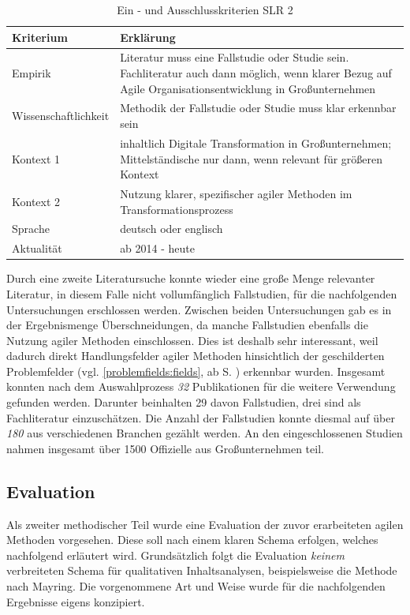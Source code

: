 \begin{table}[ht]
	\centering
	\caption{Ein - und Ausschlusskriterien SLR 2}
	\begin{tabular}{|p{4cm}|p{8cm}|}
		\hline
		\textbf{Kriterium}& \textbf{Erklärung}  \\
		\hline
		Empirik & Literatur muss eine Fallstudie oder Studie sein. Fachliteratur auch dann möglich, wenn klarer Bezug auf Agile Organisationsentwicklung in Großunternehmen \\
		Wissenschaftlichkeit & Methodik der  Fallstudie oder Studie muss klar erkennbar sein \\
		Kontext 1 & inhaltlich Digitale Transformation in Großunternehmen; Mittelständische nur dann, wenn relevant für größeren Kontext \\
		Kontext 2 & Nutzung klarer, spezifischer agiler Methoden im Transformationsprozess \\
		Sprache & deutsch oder englisch \\
		Aktualität & ab 2014 - heute  \\
		\hline
	\end{tabular}
	\label{tab:criteriaslr2}
\end{table}

Durch eine zweite Literatursuche konnte wieder eine große Menge relevanter Literatur, in diesem Falle nicht vollumfänglich Fallstudien, für die nachfolgenden Untersuchungen erschlossen werden. Zwischen beiden Untersuchungen gab es in der Ergebnismenge Überschneidungen, da manche Fallstudien ebenfalls die Nutzung agiler Methoden einschlossen. Dies ist deshalb sehr interessant, weil dadurch direkt Handlungsfelder agiler Methoden hinsichtlich der geschilderten Problemfelder (vgl. \ref{problemfields:fields}, ab S. \pageref{problemfields:fields}) erkennbar wurden. Insgesamt konnten nach dem Auswahlprozess \textit{32} Publikationen für die weitere Verwendung gefunden werden. Darunter beinhalten 29 davon Fallstudien, drei sind als Fachliteratur einzuschätzen. Die Anzahl der Fallstudien konnte diesmal auf über \textit{180} aus verschiedenen Branchen gezählt werden. An den eingeschlossenen Studien nahmen insgesamt über 1500 Offizielle aus Großunternehmen teil. 

\subsection{Evaluation}
\label{agilepractices:evaluationschema}

Als zweiter methodischer Teil wurde eine Evaluation der zuvor erarbeiteten agilen Methoden vorgesehen. Diese soll nach einem klaren Schema erfolgen, welches nachfolgend erläutert wird. Grundsätzlich folgt die Evaluation \textit{keinem} verbreiteten Schema für qualitativen Inhaltsanalysen, beispielsweise die Methode nach Mayring. Die vorgenommene Art und Weise wurde für die nachfolgenden Ergebnisse eigens konzipiert.

